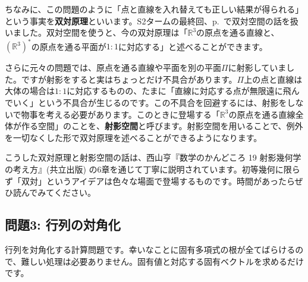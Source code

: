 ちなみに、この問題のように「点と直線を入れ替えても正しい結果が得られる」という事実を\textbf{双対原理}といいます。S2タームの最終回、p.~\pageref{section:dual_space}で双対空間の話を扱いました。双対空間を使うと、今の双対原理は「$\mathbb{R}^3$の原点を通る直線と、$(\mathbb{R}^3)^*$の原点を通る平面が$1:1$に対応する」と述べることができます。

さらに元々の問題では、原点を通る直線や平面を別の平面$\Pi$に射影していました。ですが射影をすると実はちょっとだけ不具合があります。$\Pi$上の点と直線は大体の場合は$1:1$に対応するものの、たまに「直線に対応する点が無限遠に飛んでいく」という不具合が生じるのです。この不具合を回避するには、射影をしないで物事を考える必要があります。このときに登場する「$\mathbb{R}^3$の原点を通る直線全体が作る空間」のことを、\textbf{射影空間}と呼びます。射影空間を用いることで、例外を一切なくした形で双対原理を述べることができるようになります。

こうした双対原理と射影空間の話は、西山亨『数学のかんどころ 19 射影幾何学の考え方』(共立出版) の6章を通じて丁寧に説明されています。初等幾何に限らず「双対」というアイデアは色々な場面で登場するものです。時間があったらぜひ読んでみてください。

\subsection{問題3: 行列の対角化}

行列を対角化する計算問題です。幸いなことに固有多項式の根が全てばらけるので、難しい処理は必要ありません。固有値と対応する固有ベクトルを求めるだけです。\\

